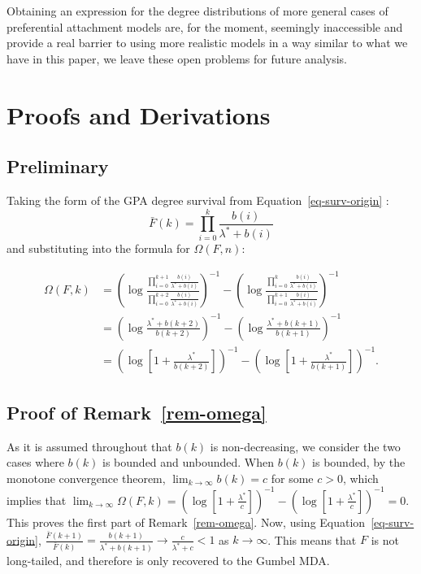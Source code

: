 \documentclass[
  sn-basic,
  10pt,
]{sn-jnl}
\theoremstyle{plain}
\theoremstyle{plain}
\theoremstyle{remark}
\begin{document}
Obtaining an expression for the degree distributions of more general
cases of preferential attachment models are, for the moment, seemingly
inaccessible and provide a real barrier to using more realistic models
in a way similar to what we have in this paper, we leave these open
problems for future analysis.

\setcounter{section}{0}
\renewcommand{\thesection}{\Alph{section}}
\setcounter{table}{0}
\renewcommand{\thetable}{A\arabic{table}}
\setcounter{figure}{0}
\renewcommand{\thefigure}{A\arabic{figure}}

\newpage

\section{Proofs and Derivations}\label{sec-proofs}

\subsection{Preliminary}\label{preliminary}

Taking the form of the GPA degree survival from
Equation~\ref{eq-surv-origin} : \[
\bar F(k) = \prod_{i=0}^k\frac{b(i)}{\lambda^*+b(i)}
\] and substituting into the formula for \(\Omega(F,n)\):

\begin{align*}
\Omega(F,k)&=\left(\log\frac{\prod_{i=0}^{k+1}\frac{b(i)}{\lambda^{*}+b(i)}}{\prod_{i=0}^{k+2}\frac{b(i)}{\lambda^{*}+b(i)}}\right)^{-1}-\left(\log\frac{\prod_{i=0}^{k}\frac{b(i)}{\lambda^{*}+b(i)}}{\prod_{i=0}^{k+1}\frac{b(i)}{\lambda^{*}+b(i)}}\right)^{-1}\\
&=\left(\log\frac{\lambda^{*}+b(k+2)}{b(k+2)}\right)^{-1}-\left(\log\frac{\lambda^{*}+b(k+1)}{b(k+1)}\right)^{-1}\\
&=\left(\log\left[1+\frac{\lambda^{*}}{b(k+2)}\right]\right)^{-1}-\left(\log\left[1+\frac{\lambda^{*}}{b(k+1)}\right]\right)^{-1}.
\end{align*}

\subsection{\texorpdfstring{Proof of
Remark~\ref{rem-omega}}{Proof of Remark~}}\label{sec-remproof}

As it is assumed throughout that \(b(k)\) is non-decreasing, we consider
the two cases where \(b(k)\) is bounded and unbounded. When \(b(k)\) is
bounded, by the monotone convergence theorem,
\(\lim_{k\rightarrow\infty}b(k) = c\) for some \(c>0\), which implies
that
\(\lim_{k\rightarrow\infty}\Omega(F,k)=\left(\log\left[1+\frac{\lambda^{*}}{c}\right]\right)^{-1}-\left(\log\left[1+\frac{\lambda^{*}}{c}\right]\right)^{-1}= 0\).
This proves the first part of Remark~\ref{rem-omega}. Now, using
Equation~\ref{eq-surv-origin},
\(\frac{\bar{F}(k+1)}{\bar{F}(k)}=\frac{b(k+1)}{\lambda^{*}+b(k+1)}\rightarrow\frac{c}{\lambda^{*}+c}<1\)
as \(k\rightarrow\infty\). This means that \(F\) is not long-tailed, and
therefore is only recovered to the Gumbel MDA.
\end{document}
